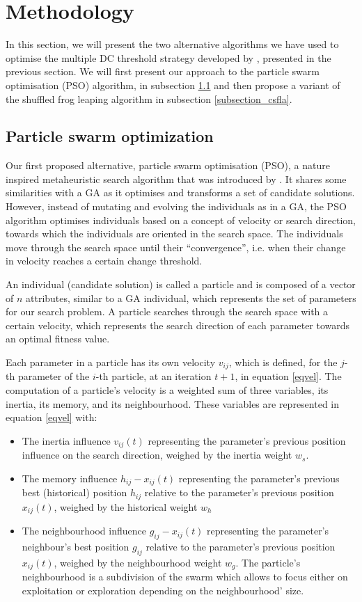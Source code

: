 \documentclass[conference]{IEEEtran}
\begin{document}
\section{Methodology}\label{methodology}
In this section, we will present the two alternative algorithms we have used to optimise the multiple DC threshold strategy developed by \cite{kampouridis_otero_dc_ga}, presented in the previous section. We will first present our approach to the particle swarm optimisation (PSO) algorithm, in subsection \ref{subsection_pso} and then propose a variant of the shuffled frog leaping algorithm in subsection \ref{subsection_csfla}.

\subsection{ Particle swarm optimization}\label{subsection_pso}
Our first proposed alternative, particle swarm optimisation (PSO), a nature inspired metaheuristic search algorithm that was introduced by \cite{pso_origin_paper}. It shares some similarities with a GA as it optimises and transforms a set of candidate solutions. However, instead of mutating and evolving the individuals as in a GA, the PSO algorithm optimises individuals based on a concept of velocity or search direction, towards which the individuals are oriented in the search space. The individuals move through the search space until their “convergence”, i.e. when their change in velocity reaches a certain change threshold.

An individual (candidate solution) is called a particle and is composed of a vector of \(n\) attributes, similar to a GA individual, which represents the set of parameters for our search problem. A particle searches through the search space with a certain velocity, which represents the search direction of each parameter towards an optimal fitness value.

Each parameter in a particle has its own velocity \(v_{ij}\), which is defined, for the \(j\)-th parameter of the \(i\)-th particle, at an iteration \(t+1\), in equation \ref{eqvel}.
The computation of a particle's velocity is a weighted sum of three variables, its inertia, its memory, and its neighbourhood. These variables are represented in equation \ref{eqvel} with:
\begin{itemize}
\item The inertia influence \(v_{ij}(t)\) representing the parameter’s previous position influence on the search direction, weighed by the inertia weight \(w_{s}\).
\item The memory influence \(h_{ij}-x_{ij}(t)\) representing the parameter’s previous best (historical) position \(h_{ij}\) relative to the parameter’s previous position \(x_{ij}(t)\), weighed by the historical weight \(w_{h}\)
\item The neighbourhood influence \(g_{ij}-x_{ij}(t)\) representing the parameter's neighbour's best position \(g_{ij}\) relative to the parameter's previous position \(x_{ij}(t)\), weighed by the neighbourhood weight \(w_{g}\).
The particle's neighbourhood is a subdivision of the swarm which allows to focus either on exploitation or exploration depending on the neighbourhood' size.
\end{itemize}
\end{document}
